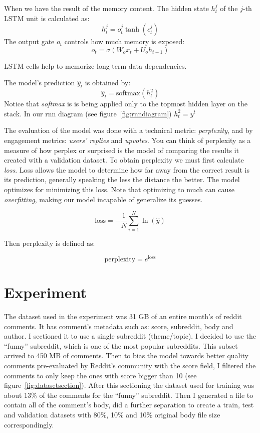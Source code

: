 \documentclass{article} %
\begin{document}
When we have the result of the memory content. The hidden state $h^j_t$ of the
$j$-th LSTM unit is calculated as:
\begin{equation}
h^j_t = o^j_t \tanh{(c^j_t)}
\end{equation}
The output gate $o_t$ controls how much memory is exposed:
\begin{equation}
o_t = \sigma{(W_o x_t + U_o h_{t-1})}
\end{equation}

LSTM cells help to memorize long term data dependencies.

The model's prediction $\hat{y}_t$ is obtained by:
\begin{equation}
\hat{y}_t = \textrm{softmax} (h^2_t)
\end{equation}
Notice that \textit{softmax} is is being applied only to the topmost hidden
layer on the stack.  In our rnn diagram (see figure~\ref{fig:rnndiagram}) $h^2_t
= y^t$

The evaluation of the model was done with a technical metric:
\textit{perplexity}, and by engagement metrics: \textit{users' replies} and
\textit{upvotes}. You can think of perplexity as a measure of how perplex or
surprised is the model of comparing the results it created with a validation
dataset. To obtain perplexity we must first calculate \textit{loss}. Loss allows
the model to determine how far away from the correct result is its
prediction, generally speaking the less the distance the better. The model
optimizes for minimizing this loss. Note that optimizing to much can cause
\textit{overfitting}, making our model incapable of generalize its guesses.

\begin{equation}
\textrm{loss} = -\frac{1}{N}\sum_{i=1}^{N} \ln{(\hat{y})}
\end{equation}

Then perplexity is defined as:

\begin{equation}
\textrm{perplexity} = e^{\textrm{loss}}
\end{equation}


\section{Experiment}
The dataset used in the experiment was 31 GB of an entire month's of reddit
comments. It has comment's metadata such as: score, subreddit, body and author.
I sectioned it to use a single subreddit (theme/topic). I decided to use the
``funny'' subreddit, which is one of the most popular subreddits. This subset
arrived to 450 MB of comments. Then to bias the model towards better quality
comments pre-evaluated by Reddit's community with the score field, I filtered
the comments to only keep the ones with score bigger than 10 (see
figure~\ref{fig:datasetsection}).  After this sectioning the dataset used for
training was about 13\% of the comments for the ``funny'' subreddit. Then I
generated a file to contain all of the comment's body, did a further separation
to create a train, test and validation datasets with 80\%, 10\% and 10\%
original body file size correspondingly.
\end{document}
